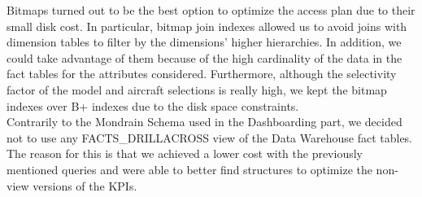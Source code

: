 \documentclass{article} %
\begin{document}
Bitmaps turned out to be the best option to optimize the access plan due to their small disk cost. In particular, bitmap join indexes allowed us to avoid joins with dimension tables to filter by the dimensions' higher hierarchies. In addition, we could take advantage of them because of the high cardinality of the data in the fact tables for the attributes considered. Furthermore, although the selectivity factor of the model and aircraft selections is really high, we kept the bitmap indexes over B+ indexes due to the disk space constraints.\\

Contrarily to the Mondrain Schema used in the Dashboarding part, we decided not to use any FACTS\_DRILLACROSS view of the Data Warehouse fact tables. The reason for this is that we achieved a lower cost with the previously mentioned queries and were able to better find structures to optimize the non-view versions of the KPIs.
\end{document}
